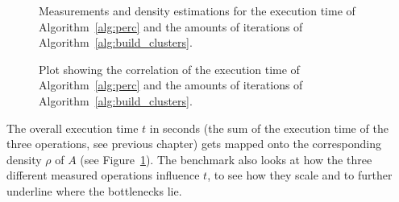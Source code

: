 \documentclass[twoside,11pt]{article}
\begin{document}
\begin{figure}[htbp]
\begin{center}
\vspace{1.5cm}

\caption{Measurements and density estimations for the
 execution time of Algorithm~\ref{alg:perc} and the amounts
 of iterations of Algorithm~\ref{alg:build_clusters}.}
\label{fig:p1}
\end{center}
\end{figure}

\begin{figure}%
\begin{center}
\caption{Plot showing the correlation of the execution time
of Algorithm~\ref{alg:perc} and the amounts of iterations
of Algorithm~\ref{alg:build_clusters}.}
\label{fig:p1:e}
\end{center}
\end{figure}

The overall execution time $t$ in seconds (the sum
of the execution time of the three operations, see previous
chapter) gets mapped onto the corresponding density $\rho$
of $A$ (see Figure~\ref{fig:p1}).
The benchmark also looks at how the three different
measured operations influence $t$, to see how they scale
and to further underline where the bottlenecks lie.
\end{document}
